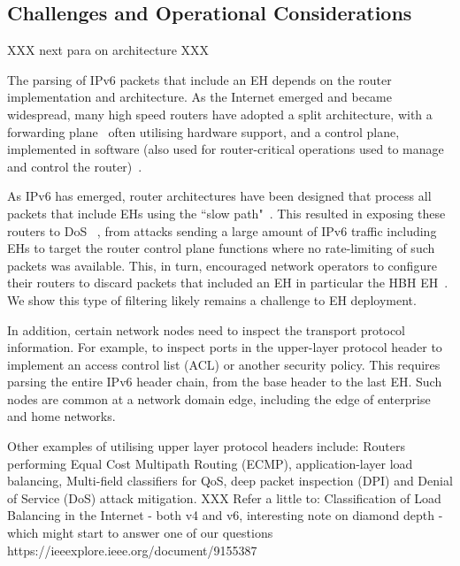 \documentclass[conference]{IEEEtran}
\begin{document}
\subsection{Challenges and Operational Considerations}

XXX next para on architecture XXX

The parsing of IPv6 packets that include an EH depends on 
the router implementation and
architecture. As the Internet emerged and became widespread, many high speed routers have adopted a split architecture, 
with a forwarding plane~\cite{RFC3654} often utilising hardware support, and a control plane, implemented in software (also used for router-critical operations used to manage and control the router)~\cite{router-architecture}.


As IPv6 has emerged, router architectures have been designed that process all packets that include EHs using the ``slow path"~\cite{ietf-v6ops-hbh-03}.  This resulted in exposing these routers to DoS ~\cite{naagas2021deh}, from attacks sending a large amount of IPv6 traffic including EHs to target the router control plane functions where no rate-limiting of such packets was available. This, in turn, encouraged
network operators to configure their routers to discard packets that included an EH
in particular the HBH EH~\cite{ietf-v6ops-hbh-03}. We show this type of filtering likely remains a challenge to EH deployment.

In addition, certain network nodes need to inspect the transport protocol information. For example, to inspect ports in the upper-layer protocol header to implement an access control list (ACL) or another security policy.
This requires parsing the entire IPv6 header chain, from the base header to the last EH. 
Such nodes are common at a network domain edge, including the edge of enterprise and home networks.

Other examples of utilising upper layer protocol headers include: Routers performing Equal Cost Multipath Routing (ECMP), application-layer load balancing, Multi-field classifiers for QoS, deep packet inspection (DPI) and Denial of Service (DoS) attack mitigation. 
XXX
Refer a little to:
Classification of Load Balancing in the Internet - both v4 and v6, interesting note on diamond depth - which might start to answer one of our questions
https://ieeexplore.ieee.org/document/9155387
\end{document}
